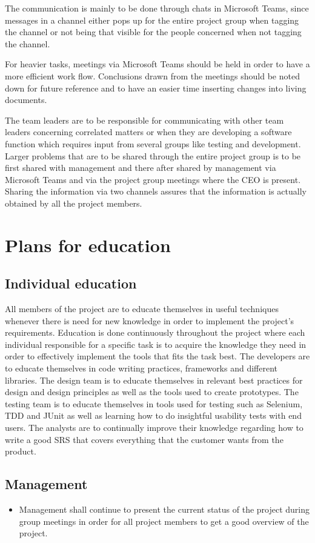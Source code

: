 \documentclass[12pt]{article}
\begin{document}
The communication is mainly to be done through chats in Microsoft Teams, since messages in a channel either pops up for the entire project group when tagging the channel or not being that visible for the people concerned when not tagging the channel.

For heavier tasks, meetings via Microsoft Teams should be held in order to have a more efficient work flow. Conclusions drawn from the meetings should be noted down for future reference and to have an easier time inserting changes into living documents.

The team leaders are to be responsible for communicating with other team leaders concerning correlated matters or when they are developing a software function which requires input from several groups like testing and development. Larger problems that are to be shared through the entire project group is to be first shared with management and there after shared by management via Microsoft Teams and via the project group meetings where the CEO is present. Sharing the information via two channels assures that the information is actually obtained by all the project members. 

\section{Plans for education}
\subsection{Individual education}
All members of the project are to educate themselves in useful techniques whenever there is need for new knowledge in order to implement the project's requirements. Education is done continuously throughout the project where each individual responsible for a specific task is to acquire the knowledge they need in order to effectively implement the tools that fits the task best. The developers are to educate themselves in code writing practices, frameworks and different libraries. The design team is to educate themselves in relevant best practices for design and design principles as well as the tools used to create prototypes. The testing team is to educate themselves in tools used for testing such as Selenium, TDD and JUnit as well as learning how to do insightful usability tests with end users. The analysts are to continually improve their knowledge regarding how to write a good SRS that covers everything that the customer wants from the product.

\subsection{Management}
\begin{itemize}
    \item Management shall continue to present the current status of the project during group meetings in order for all project members to get a good overview of the project.
\end{itemize}
 
\end{document}
